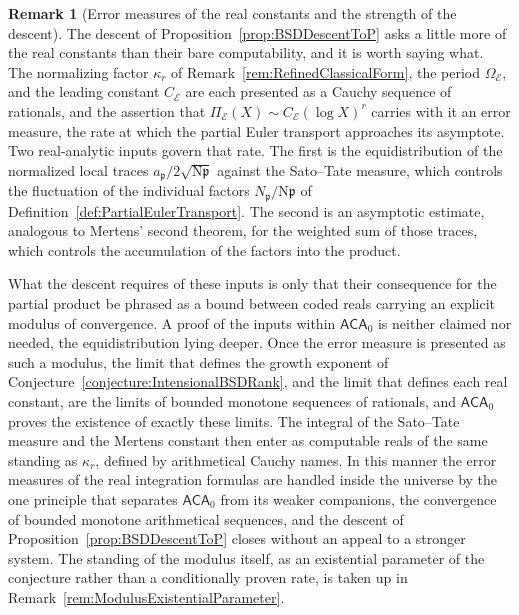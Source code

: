 \documentclass[10pt, reqno]{amsart}
\theoremstyle{plain}
\theoremstyle{definition}
\newtheorem{remark}[theorem]{Remark}
\theoremstyle{plain}
\begin{document}
\begin{remark}[Error measures of the real constants and the strength of the descent]\label{rem:BSDErrorMeasures}
The descent of Proposition~\ref{prop:BSDDescentToP} asks a little more of the real constants than their bare computability, and it is worth saying what. The normalizing factor $\kappa_r$ of Remark~\ref{rem:RefinedClassicalForm}, the period $\Omega_{\mathcal{E}}$, and the leading constant $C_{\mathcal{E}}$ are each presented as a Cauchy sequence of rationals, and the assertion that $\Pi_{\mathcal{E}}(X)\sim C_{\mathcal{E}}(\log X)^{r}$ carries with it an error measure, the rate at which the partial Euler transport approaches its asymptote. Two real-analytic inputs govern that rate. The first is the equidistribution of the normalized local traces $a_{\mathfrak{p}}/2\sqrt{\mathrm{N}\mathfrak{p}}$ against the Sato--Tate measure, which controls the fluctuation of the individual factors $N_{\mathfrak{p}}/\mathrm{N}\mathfrak{p}$ of Definition~\ref{def:PartialEulerTransport}. The second is an asymptotic estimate, analogous to Mertens' second theorem, for the weighted sum of those traces, which controls the accumulation of the factors into the product.

What the descent requires of these inputs is only that their consequence for the partial product be phrased as a bound between coded reals carrying an explicit modulus of convergence. A proof of the inputs within $\mathsf{ACA}_0$ is neither claimed nor needed, the equidistribution lying deeper. Once the error measure is presented as such a modulus, the limit that defines the growth exponent of Conjecture~\ref{conjecture:IntensionalBSDRank}, and the limit that defines each real constant, are the limits of bounded monotone sequences of rationals, and $\mathsf{ACA}_0$ proves the existence of exactly these limits. The integral of the Sato--Tate measure and the Mertens constant then enter as computable reals of the same standing as $\kappa_r$, defined by arithmetical Cauchy names. In this manner the error measures of the real integration formulas are handled inside the universe by the one principle that separates $\mathsf{ACA}_0$ from its weaker companions, the convergence of bounded monotone arithmetical sequences, and the descent of Proposition~\ref{prop:BSDDescentToP} closes without an appeal to a stronger system. The standing of the modulus itself, as an existential parameter of the conjecture rather than a conditionally proven rate, is taken up in Remark~\ref{rem:ModulusExistentialParameter}.
\end{remark}
\end{document}
